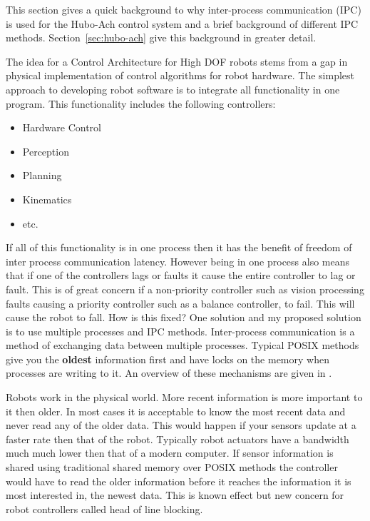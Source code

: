 
This section gives a quick background to why inter-process communication (IPC) is used for the Hubo-Ach control system and a brief background of different IPC methods.
Section~\ref{sec:hubo-ach} give this background in greater detail.

The idea for a Control Architecture for High DOF robots stems from a gap in physical implementation of control algorithms for robot hardware.
The simplest approach to developing robot software is to integrate all functionality in one program.  
This functionality includes the following controllers:
\begin{multicols}{2}
\begin{itemize}
\item Hardware Control
\item Perception
\item Planning
\item Kinematics
\item etc.
\end{itemize}
\end{multicols}

If all of this functionality is in one process then it has the benefit of freedom of inter process communication latency.
However being in one process also means that if one of the controllers lags or faults it cause the entire controller to lag or fault.
This is of great concern if a non-priority controller such as vision processing faults causing a priority controller such as a balance controller, to fail.
This will cause the robot to fall.
How is this fixed?
One solution and my proposed solution is to use multiple processes and IPC methods.
Inter-process communication is a method of exchanging data between multiple processes.
Typical POSIX methods give you the \textbf{oldest} information first and have locks on the memory when processes are writing to it.
An overview of these mechanisms are given in \cite{stevens2005advanced}.

Robots work in the physical world. 
More recent information is more important to it then older.
In most cases it is acceptable to know the most recent data and never read any of the older data.
This would happen if your sensors update at a faster rate then that of the robot.
Typically robot actuators have a bandwidth much much lower then that of a modern computer.
If sensor information is shared using traditional shared memory over POSIX methods the controller would have to read the older information before it reaches the information it is most interested in, the newest data.
This is known effect but new concern for robot controllers called head of line blocking\cite{ach}.

